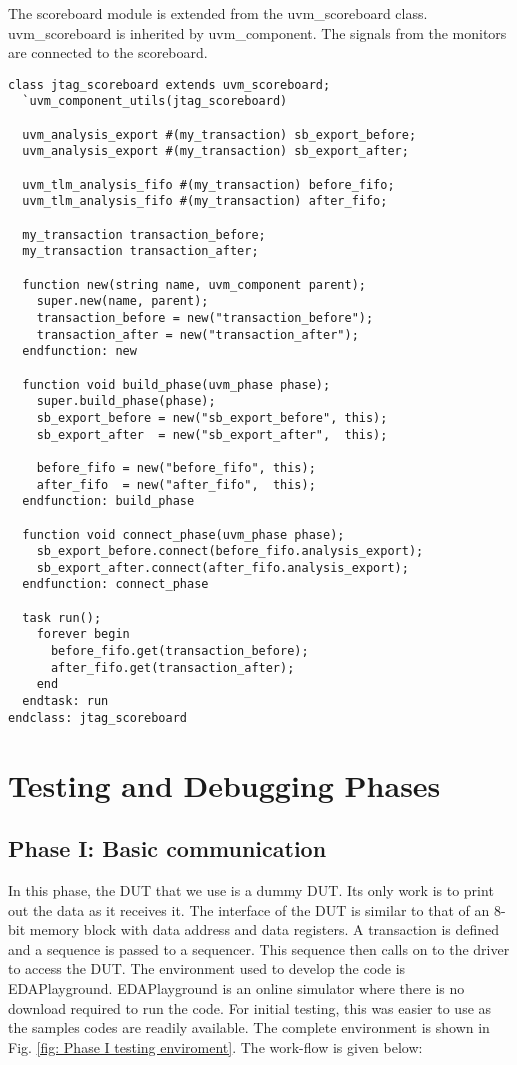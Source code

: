 \documentclass[a4paper,11pt]{article}
\begin{document}
The scoreboard module is extended from the uvm\_scoreboard class. uvm\_scoreboard is inherited by uvm\_component. The signals from the monitors are connected to the scoreboard.

\begin{lstlisting}[style={verilog-style}, backgroundcolor=\color{lightgray}]
class jtag_scoreboard extends uvm_scoreboard;
  `uvm_component_utils(jtag_scoreboard)
	
  uvm_analysis_export #(my_transaction) sb_export_before;
  uvm_analysis_export #(my_transaction) sb_export_after;
	
  uvm_tlm_analysis_fifo #(my_transaction) before_fifo;
  uvm_tlm_analysis_fifo #(my_transaction) after_fifo;
	
  my_transaction transaction_before;
  my_transaction transaction_after;
	
  function new(string name, uvm_component parent);
    super.new(name, parent);
    transaction_before = new("transaction_before");
    transaction_after = new("transaction_after");
  endfunction: new
	
  function void build_phase(uvm_phase phase);
    super.build_phase(phase);
    sb_export_before = new("sb_export_before", this);
    sb_export_after  = new("sb_export_after",  this);
		
    before_fifo = new("before_fifo", this);
    after_fifo  = new("after_fifo",  this);
  endfunction: build_phase
	
  function void connect_phase(uvm_phase phase);
    sb_export_before.connect(before_fifo.analysis_export);
    sb_export_after.connect(after_fifo.analysis_export);
  endfunction: connect_phase
	
  task run();
    forever begin
      before_fifo.get(transaction_before);
      after_fifo.get(transaction_after);
    end
  endtask: run
endclass: jtag_scoreboard
\end{lstlisting}

\FloatBarrier
\newpage
\pagebreak

\section{Testing and Debugging Phases}
\subsection{Phase I: Basic communication}
In this phase, the DUT that we use is a dummy DUT. Its only work is to print out the data as it receives it. The interface of the DUT is similar to that of an 8-bit memory block with data address and data registers. A transaction is defined and a sequence is passed to a sequencer. This sequence then calls on to the driver to access the DUT. The environment used to develop the code is EDAPlayground. EDAPlayground is an online simulator where there is no download required to run the code. For initial testing, this was easier to use as the samples codes are readily available. The complete environment is shown in Fig. \ref{fig: Phase I testing enviroment}.
The work-flow is given below:
\end{document}
